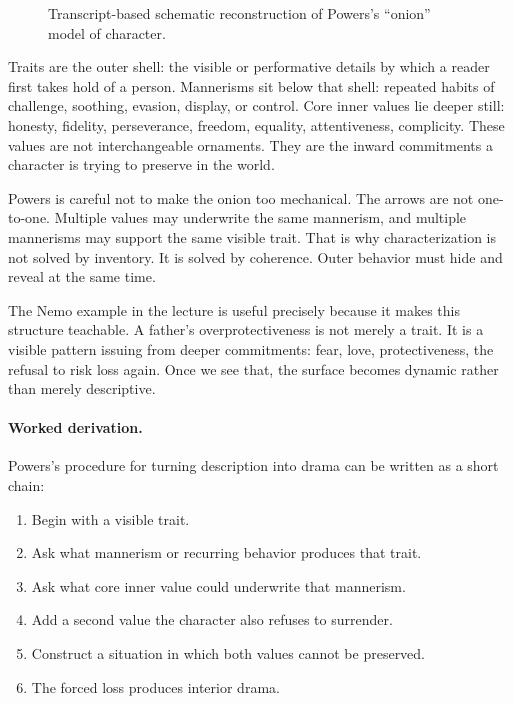 \begin{figure}[h]
\centering
{}
\caption{Transcript-based schematic reconstruction of Powers's ``onion'' model of character.}
\end{figure}

Traits are the outer shell: the visible or performative details by which a reader first takes hold of a person. Mannerisms sit below that shell: repeated habits of challenge, soothing, evasion, display, or control. Core inner values lie deeper still: honesty, fidelity, perseverance, freedom, equality, attentiveness, complicity. These values are not interchangeable ornaments. They are the inward commitments a character is trying to preserve in the world.

Powers is careful not to make the onion too mechanical. The arrows are not one-to-one. Multiple values may underwrite the same mannerism, and multiple mannerisms may support the same visible trait. That is why characterization is not solved by inventory. It is solved by coherence. Outer behavior must hide and reveal at the same time.

The Nemo example in the lecture is useful precisely because it makes this structure teachable. A father's overprotectiveness is not merely a trait. It is a visible pattern issuing from deeper commitments: fear, love, protectiveness, the refusal to risk loss again. Once we see that, the surface becomes dynamic rather than merely descriptive.

\paragraph{Worked derivation.} Powers's procedure for turning description into drama can be written as a short chain:
\begin{enumerate}
\item Begin with a visible trait.
\item Ask what mannerism or recurring behavior produces that trait.
\item Ask what core inner value could underwrite that mannerism.
\item Add a second value the character also refuses to surrender.
\item Construct a situation in which both values cannot be preserved.
\item The forced loss produces interior drama.
\end{enumerate}


